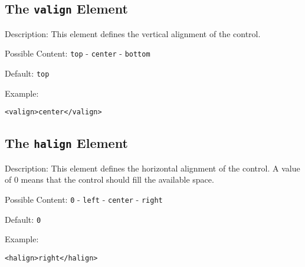 \subsection{ The \texttt{valign} Element}
\label{valign}
\begin{description}
 \item Description: This element defines the vertical alignment of the control.

 \item Possible Content: \texttt{top} - \texttt{center} - \texttt{bottom}

 \item Default: \texttt{top}

 \item Example: 

\begin{lstlisting}[caption=\texttt{valign} Element]
<valign>center</valign>
\end{lstlisting}
\end{description}




\subsection{ The \texttt{halign} Element}
\label{halign}
\begin{description}
 \item Description: This element defines the horizontal alignment of the control. A value of 0 means that the control should fill the available space.

 \item Possible Content: \texttt{0} - \texttt{left} - \texttt{center} - \texttt{right}

 \item Default: \texttt{0}

 \item Example: 

\begin{lstlisting}[caption=\texttt{halign} Element]
<halign>right</halign>
\end{lstlisting}
\end{description}





